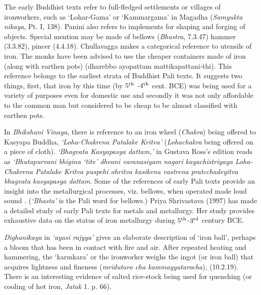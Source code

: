 The  early Buddhist texts refer to full-fledged settlements or villages of ironworkers, such as `Lohar-Gama' or `Kammargama' in Magadha ({\it Samyukta nikaya}, Pt. I, 138). Panini also refers to implements for shaping and forging of objects. Special mention may be made of bellows ({\it Bhastra}, 7.3.47) hammer (3.3.82), pincer (4.4.18).  Chullavagga makes a categorical reference to utensils of iron. The monks have been advised to use the cheaper containers made of iron (along with earthen pots) ({\rm dharebbo ayopattam mattikapattani-thi}). This reference belongs to the earliest strata of Buddhist Pali texts. It suggests two things, first, that iron by this time (by $5^{\rm th}$ -$4^{\rm th}$ cent. BCE) was being used for a variety of purposes even for domestic use and secondly it was not only affordable to the common man but considered to be cheap to be almost classified with earthen pots. 

In {\it Bhikshuni Vinaya}, there is reference to an iron wheel ({\it Chakra}) being offered to Kasyapa Buddha, {\it ‘Loha-Chakrena Patalake Kritva’} ({\it Lohachakra} being offered on a piece of cloth). {\it ‘Bhagvata Kasyapasya dattam,’} in Gustava Ross’s edition reads as {\it ‘Bhutapurvani bhigina ‘tite’ dhvani varanasiyam nagari kayachistriyaya Loha-Chakrena Patalake Kritva puspehi ohritva kasikena vastrena pratcchadeyitva bhagvata kasyapasya dattam}. Some of the references of early Pali texts provide an insight into the metallurgical processes, viz. bellows, when operated made loud sound . ({\it ‘Bhasta’} is the Pali word for bellows.) Priya Shrivastava (1997) has made a detailed study of early Pali texts for metals and metallurgy. Her study provides exhaustive data on the status of iron metallurgy during $5^{\rm th}$-$3^{\rm rd}$ century BCE.

{\it Dighanikaya} in {\it ‘ayasi rajyya’} gives an elaborate description of ‘iron ball’, perhaps a bloom that has been in contact with fire and air. After repeated heating and hammering, the ‘karmkara’ or the ironworker weighs the ingot (or iron ball) that acquires lightness and fineness ({\it mridutaro cha kammayyatarocha}), (10.2.19). There is an interesting evidence of salted rice-stock being used for quenching (or cooling of hot iron, {\it Jatak} 1. p. 66).

